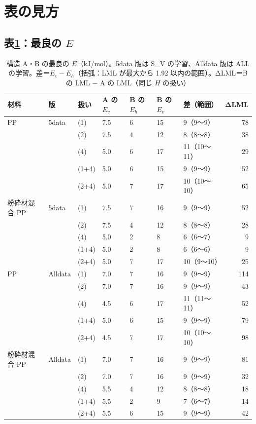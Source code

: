 \documentclass[paper=a4paper,fontsize=10.5pt,line_length=44zw,number_of_lines=38]{jlreq}
\newcommand{\Eh}{E_{h}}
\newcommand{\Ev}{E_{v}}
\begin{document}
\section{表の見方}


\subsection{表\ref{tab:E}：最良の $E$}
\begin{table}[H]
\caption{構造 A・B の最良の $E$（kJ/mol）。5data 版は S\_V の学習、Alldata 版は ALL の学習。差＝$\Ev-\Eh$（括弧：LML が最大から 1.92 以内の範囲）。ΔLML＝B の LML $-$ A の LML（同じ $H$ の扱い）}\label{tab:E}
\footnotesize
\begin{tabularx}{\linewidth}{@{}llllllXr@{}}
\toprule
材料 & 版 & 扱い & A の $\Ev$ & B の $\Eh$ & B の $\Ev$ & 差（範囲） & ΔLML \\
\midrule
PP & 5data & (1) & 7.5 & 6 & 15 & 9（9〜9） & 78 \\
 &  & (2) & 7.5 & 4 & 12 & 8（8〜8） & 38 \\
 &  & (4) & 5.0 & 6 & 17 & 11（10〜11） & 29 \\
 &  & (1+4) & 5.0 & 6 & 15 & 9（9〜9） & 52 \\
 &  & (2+4) & 5.0 & 7 & 17 & 10（10〜10） & 65 \\
\midrule
粉砕材混合 PP & 5data & (1) & 7.5 & 7 & 16 & 9（9〜9） & 52 \\
 &  & (2) & 7.5 & 4 & 12 & 8（8〜8） & 28 \\
 &  & (4) & 5.0 & 2 & 8 & 6（6〜7） & 9 \\
 &  & (1+4) & 5.0 & 2 & 8 & 6（6〜6） & 9 \\
 &  & (2+4) & 5.0 & 7 & 17 & 10（9〜10） & 25 \\
\midrule
PP & Alldata & (1) & 7.0 & 7 & 16 & 9（9〜9） & 114 \\
 &  & (2) & 7.0 & 7 & 16 & 9（9〜9） & 43 \\
 &  & (4) & 4.5 & 6 & 17 & 11（11〜11） & 52 \\
 &  & (1+4) & 5.0 & 6 & 15 & 9（9〜9） & 79 \\
 &  & (2+4) & 4.5 & 7 & 17 & 10（10〜10） & 98 \\
\midrule
粉砕材混合 PP & Alldata & (1) & 7.0 & 7 & 16 & 9（9〜9） & 81 \\
 &  & (2) & 7.0 & 7 & 16 & 9（9〜9） & 32 \\
 &  & (4) & 5.5 & 4 & 12 & 8（8〜8） & 18 \\
 &  & (1+4) & 5.5 & 2 & 9 & 7（6〜7） & 14 \\
 &  & (2+4) & 5.5 & 6 & 15 & 9（9〜9） & 42 \\

\bottomrule
\end{tabularx}
\end{table}
\end{document}
